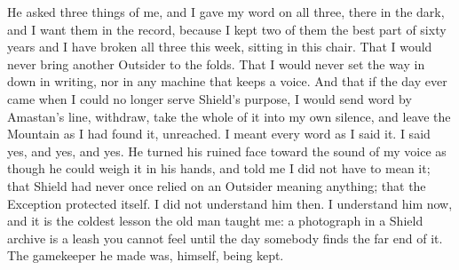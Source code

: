 He asked three things of me, and I gave my word on all three, there in the dark, and I want them in the record, because I kept two of them the best part of sixty years and I have broken all three this week, sitting in this chair. That I would never bring another Outsider to the folds. That I would never set the way in down in writing, nor in any machine that keeps a voice. And that if the day ever came when I could no longer serve Shield's purpose, I would send word by Amastan's line, withdraw, take the whole of it into my own silence, and leave the Mountain as I had found it, unreached. I meant every word as I said it. I said yes, and yes, and yes. He turned his ruined face toward the sound of my voice as though he could weigh it in his hands, and told me I did not have to mean it; that Shield had never once relied on an Outsider meaning anything; that the Exception protected itself. I did not understand him then. I understand him now, and it is the coldest lesson the old man taught me: a photograph in a Shield archive is a leash you cannot feel until the day somebody finds the far end of it. The gamekeeper he made was, himself, being kept.\par

